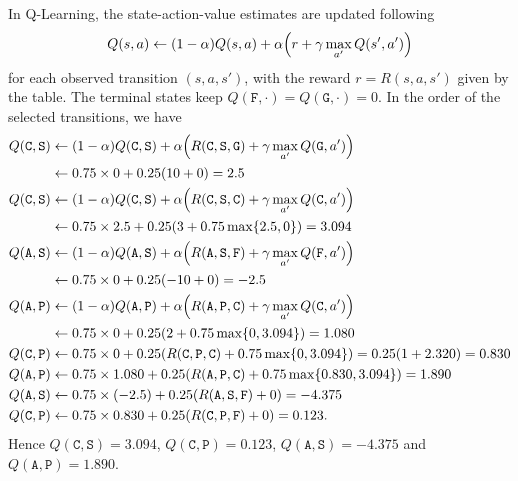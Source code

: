 \documentclass[11pt, a4paper]{exam}
\newcommand*{\C}{\texttt{C}}
\newcommand*{\A}{\texttt{A}}
\newcommand*{\F}{\texttt{F}}
\newcommand*{\G}{\texttt{G}}
\renewcommand*{\P}{\texttt{P}}
\renewcommand*{\S}{\texttt{S}}
\begin{document}
\begin{exercises}
\begin{parts}
    \begin{solution}
        In Q-Learning, the state-action-value estimates are updated following
        \begin{equation*}
            Q(s, a) \leftarrow (1 - \alpha) Q(s, a) + \alpha \rbk*{r + \gamma \max_{a'} Q(s', a')}
        \end{equation*}
        for each observed transition $(s, a, s')$, with the reward $r = R(s, a, s')$ given by the table. The terminal states keep $Q(\F, \cdot) = Q(\G, \cdot) = 0$. In the order of the selected transitions, we have
        \begin{align*}
            Q(\C, \S) & \leftarrow (1 - \alpha) Q(\C, \S) + \alpha \rbk*{R(\C, \S, \G) + \gamma \max_{a'} Q(\G, a')} \\
            & \leftarrow 0.75 \times 0 + 0.25 \rbk{10 + 0} = 2.5 \\
            Q(\C, \S) & \leftarrow (1 - \alpha) Q(\C, \S) + \alpha \rbk*{R(\C, \S, \C) + \gamma \max_{a'} Q(\C, a')} \\
            & \leftarrow 0.75 \times 2.5 + 0.25 \rbk{3 + 0.75 \max \cbk{2.5, 0}} = 3.094 \\
            Q(\A, \S) & \leftarrow (1 - \alpha) Q(\A, \S) + \alpha \rbk*{R(\A, \S, \F) + \gamma \max_{a'} Q(\F, a')} \\
            & \leftarrow 0.75 \times 0 + 0.25 \rbk{-10 + 0} = -2.5 \\
            Q(\A, \P) & \leftarrow (1 - \alpha) Q(\A, \P) + \alpha \rbk*{R(\A, \P, \C) + \gamma \max_{a'} Q(\C, a')} \\
            & \leftarrow 0.75 \times 0 + 0.25 \rbk{2 + 0.75 \max \cbk{0, 3.094}} = 1.080 \\
            Q(\C, \P) & \leftarrow 0.75 \times 0 + 0.25 \rbk{R(\C, \P, \C) + 0.75 \max \cbk{0, 3.094}} = 0.25 \rbk{1 + 2.320} = 0.830 \\
            Q(\A, \P) & \leftarrow 0.75 \times 1.080 + 0.25 \rbk{R(\A, \P, \C) + 0.75 \max \cbk{0.830, 3.094}} = 1.890 \\
            Q(\A, \S) & \leftarrow 0.75 \times (-2.5) + 0.25 \rbk{R(\A, \S, \F) + 0} = -4.375 \\
            Q(\C, \P) & \leftarrow 0.75 \times 0.830 + 0.25 \rbk{R(\C, \P, \F) + 0} = 0.123 .
        \end{align*}
        Hence $Q(\C, \S) = 3.094$, $Q(\C, \P) = 0.123$, $Q(\A, \S) = -4.375$ and $Q(\A, \P) = 1.890$.
    \end{solution}


\end{parts}
\end{exercises}
\end{document}
